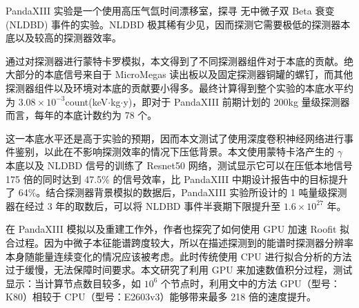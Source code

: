 
\pkuthssffaq %

PandaXIII 实验是一个使用高压气氙时间漂移室，探寻 \xeots 无中微子双 Beta 衰变 (NLDBD) 事件的实验。NLDBD 极其稀有少见，因而探测它需要极低的探测器本底以及较高的探测器效率。

通过对探测器进行蒙特卡罗模拟，本文得到了不同探测器组件对于本底的贡献。绝大部分的本底信号来自于 MicroMegas 读出板以及固定探测器铜罐的螺钉，而其他探测器组件以及环境对本底的贡献要小得多。最终计算得到整个实验的本底水平约为 $3.08\times 10^{-3}$count\/(keV$\cdot$kg$\cdot$y)，即对于 PandaXIII 前期计划的 200kg 量级探测器而言，每年的本底计数约为 78 个。

这一本底水平还是高于实验的预期，因而本文测试了使用深度卷积神经网络进行事件鉴别，以此在不影响探测效率的情况下压低背景。本文使用蒙特卡洛产生的 $\gamma$ 本底以及 NLDBD 信号的训练了 Resnet50 网络，测试显示它可以在压低本地信号 175 倍的同时达到 47.5\% 的信号效率，比 PandaXIII 中期设计报告中的目标提升了 64\%。结合探测器背景模拟的数据后，PandaXIII 实验所设计的 1 吨量级探测器在经过 3 年的取数后，可以将 \xeots NLDBD 事件半衰期下限提升至 $1.6\times10^{27}$ 年。

在 PandaXIII 模拟以及重建工作外，作者也探究了如何使用 GPU 加速 Roofit 拟合过程。因为中微子本征能谱跨度较大，所以在描述探测到的能谱时探测器分辨率本身随能量连续变化的情况应该被考虑。此时传统使用 CPU 进行拟合分析的方法过于缓慢，无法保障时间要求。本文研究了利用 GPU 来加速数值积分过程，测试显示：当计算节点数目较多，如 $10^{6}$ 个节点时，利用文中的方法 GPU（型号：K80）相较于 CPU（型号：E2603v3）能够带来最多 218 倍的速度提升。


